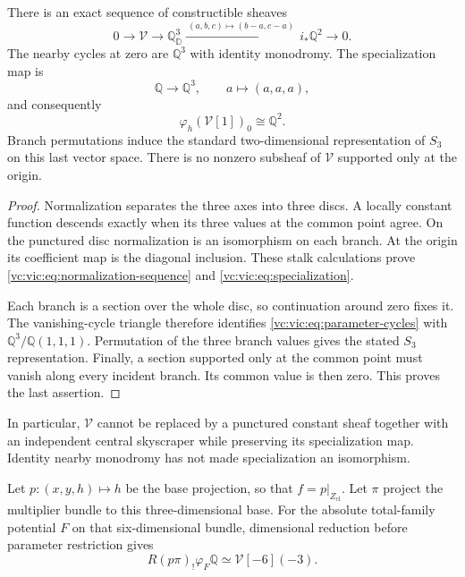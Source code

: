 \begin{theorem}\label{vc:vic:thm:specialization}
There is an exact sequence of constructible sheaves
\begin{equation}\label{vc:vic:eq:normalization-sequence}
 0\longrightarrow\mathcal V\longrightarrow\mathbb Q_{\mathbb D}^3
   \xrightarrow{\ (a,b,c)\mapsto(b-a,c-a)\ }
      i_*\mathbb Q^2\longrightarrow0.
\end{equation}
The nearby cycles at zero are $\mathbb Q^3$ with identity
monodromy. The specialization map is
\begin{equation}\label{vc:vic:eq:specialization}
 \mathbb Q\longrightarrow\mathbb Q^3,
       \qquad a\longmapsto(a,a,a),
\end{equation}
and consequently
\begin{equation}\label{vc:vic:eq:parameter-cycles}
 \varphi_h(\mathcal V[1])_0\cong\mathbb Q^2.
\end{equation}
Branch permutations induce the standard two-dimensional
representation of $S_3$ on this last vector space.
There is no nonzero subsheaf of $\mathcal V$ supported only
at the origin.
\end{theorem}

\begin{proof}
Normalization separates the three axes into three discs.
A locally constant function descends exactly when its
three values at the common point agree. On the punctured
disc normalization is an isomorphism on each branch. At
the origin its coefficient map is the diagonal inclusion.
These stalk calculations prove
\eqref{vc:vic:eq:normalization-sequence} and
\eqref{vc:vic:eq:specialization}.

Each branch is a section over the whole disc, so continuation
around zero fixes it. The vanishing-cycle triangle therefore
identifies \eqref{vc:vic:eq:parameter-cycles} with
$\mathbb Q^3/\mathbb Q(1,1,1)$.
Permutation of the three branch values gives the stated
$S_3$ representation.
Finally, a section supported only at the common point must
vanish along every incident branch. Its common value is
then zero. This proves the last assertion.
\end{proof}

In particular, $\mathcal V$ cannot be replaced by a punctured
constant sheaf together with an independent central
skyscraper while preserving its specialization map.
Identity nearby monodromy has not made specialization an
isomorphism.

Let $p:(x,y,h)\mapsto h$ be the base projection, so that
$f=p|_{Z_{\mathrm{cl}}}$. Let $\pi$ project the multiplier
bundle to this three-dimensional base.
For the absolute total-family potential $F$ on that
six-dimensional bundle, dimensional reduction before
parameter restriction gives
\begin{equation}\label{vc:vic:eq:absolute-family}
 R(p\pi)_!\varphi_F\mathbb Q\simeq\mathcal V[-6](-3).
\end{equation}

